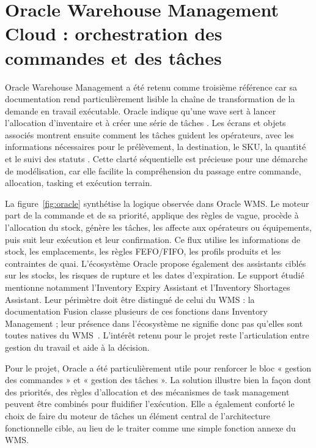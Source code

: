 
\section{Oracle Warehouse Management Cloud : orchestration des commandes et des tâches}

\label{sec:2.5}

Oracle Warehouse Management a été retenu comme troisième référence car sa documentation rend particulièrement lisible la chaîne de transformation de la demande en travail exécutable. Oracle indique qu’une wave sert à lancer l’allocation d’inventaire et à créer une série de tâches \cite{ref8}. Les écrans et objets associés montrent ensuite comment les tâches guident les opérateurs, avec les informations nécessaires pour le prélèvement, la destination, le SKU, la quantité et le suivi des statuts \cite{ref9}. Cette clarté séquentielle est précieuse pour une démarche de modélisation, car elle facilite la compréhension du passage entre commande, allocation, tasking et exécution terrain.




La figure~\ref{fig:oracle} synthétise la logique observée dans Oracle WMS. Le moteur part de la commande et de sa priorité, applique des règles de vague, procède à l’allocation du stock, génère les tâches, les affecte aux opérateurs ou équipements, puis suit leur exécution et leur confirmation. Ce flux utilise les informations de stock, les emplacements, les règles FEFO/FIFO, les profils produits et les contraintes de quai. L’écosystème Oracle propose également des assistants ciblés sur les stocks, les risques de rupture et les dates d’expiration. Le support étudié mentionne notamment l’Inventory Expiry Assistant et l’Inventory Shortages Assistant. Leur périmètre doit être distingué de celui du WMS : la documentation Fusion classe plusieurs de ces fonctions dans Inventory Management ; leur présence dans l’écosystème ne signifie donc pas qu’elles sont toutes natives du WMS~\cite{ref10}. L’intérêt retenu pour le projet reste l’articulation entre gestion du travail et aide à la décision.


Pour le projet, Oracle a été particulièrement utile pour renforcer le bloc « gestion des commandes » et « gestion des tâches ». La solution illustre bien la façon dont des priorités, des règles d’allocation et des mécanismes de task management peuvent être combinés pour fluidifier l’exécution. Elle a également conforté le choix de faire du moteur de tâches un élément central de l’architecture fonctionnelle cible, au lieu de le traiter comme une simple fonction annexe du WMS.


